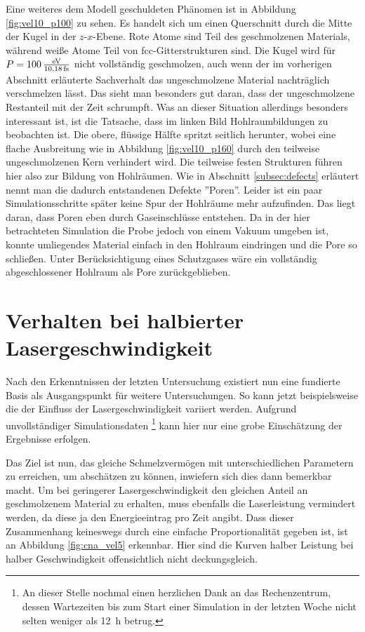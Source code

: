 		Eine weiteres dem Modell geschuldeten Phänomen ist in Abbildung \ref{fig:vel10_p100}
		zu sehen. Es handelt sich um einen Querschnitt durch die Mitte der Kugel in der
		$z$-$x$-Ebene. Rote Atome sind Teil des geschmolzenen Materials, während weiße Atome Teil
		von fcc-Gitterstrukturen sind. Die Kugel wird für $P = \powerunit[100]$ nicht
		vollständig geschmolzen, auch wenn der im vorherigen Abschnitt erläuterte Sachverhalt das
		ungeschmolzene Material nachträglich verschmelzen lässt. Das sieht man besonders gut
		daran, dass der ungeschmolzene Restanteil mit der Zeit schrumpft. Was an dieser Situation
		allerdings besonders interessant ist, ist die Tatsache, dass im linken Bild
		Hohlraumbildungen zu beobachten ist. Die obere, flüssige Hälfte spritzt seitlich herunter,
		wobei eine flache Ausbreitung wie in Abbildung \ref{fig:vel10_p160} durch den teilweise
		ungeschmolzenen Kern verhindert wird. Die teilweise festen Strukturen führen hier also zur
		Bildung von Hohlräumen. Wie in Abschnitt \ref{subsec:defects} erläutert nennt man die
		dadurch entstandenen Defekte ''Poren''. Leider ist ein paar Simulationsschritte später
		keine Spur der Hohlräume mehr aufzufinden. Das liegt daran, dass Poren eben durch
		Gaseinschlüsse entstehen. Da in der hier betrachteten Simulation die Probe jedoch von
		einem Vakuum umgeben ist, konnte umliegendes Material einfach in den Hohlraum eindringen
		und die Pore so schließen. Unter Berücksichtigung eines Schutzgases wäre ein vollständig
		abgeschlossener Hohlraum als Pore zurückgeblieben.


\section{Verhalten bei halbierter Lasergeschwindigkeit}
		Nach den Erkenntnissen der letzten Untersuchung existiert nun eine fundierte Basis als
		Ausgangspunkt für weitere Untersuchungen. So kann jetzt beispielsweise die der Einfluss der
		Lasergeschwindigkeit variiert werden. Aufgrund unvollständiger Simulationsdaten
		\footnote{An dieser Stelle nochmal einen herzlichen Dank an das Rechenzentrum, dessen
		Wartezeiten bis zum Start einer Simulation in der letzten Woche nicht selten weniger als
		\SI{12}{h} betrug.}
		kann hier nur eine grobe Einschätzung der Ergebnisse erfolgen.

		Das Ziel ist nun, das gleiche Schmelzvermögen mit unterschiedlichen Parametern zu
		erreichen, um abschätzen zu können, inwiefern sich dies dann bemerkbar macht. Um bei
		geringerer Lasergeschwindigkeit den gleichen Anteil an geschmolzenem Material zu
		erhalten, muss ebenfalls die Laserleistung vermindert werden, da diese ja den
		Energieeintrag pro Zeit angibt. Dass dieser Zusammenhang keineswegs
		durch eine einfache Proportionalität gegeben ist, ist an Abbildung \ref{fig:cna_vel5}
		erkennbar. Hier sind die Kurven halber Leistung bei halber Geschwindigkeit offensichtlich
		nicht deckungsgleich.

